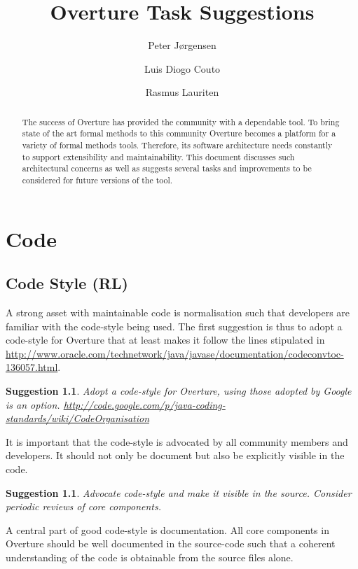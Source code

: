 \documentclass[11pt]{overturerep} \usepackage{t1enc,times,a4,t1enc}
\title{Overture Task Suggestions}
\author{ Peter J\o rgensen \and Luis Diogo Couto \and Rasmus Lauriten }
\newtheorem{sug}[subsection]{Suggestion}
\begin{document}
\maketitle


\begin{abstract} 
    The success of Overture has provided the community with a dependable tool.
    To bring state of the art formal methods to this community Overture becomes
    a platform for a variety of formal methods tools.  Therefore, its software
    architecture needs constantly to support extensibility and maintainability.
    This document discusses such architectural concerns as well as suggests
    several tasks and improvements to be considered for future versions of the
    tool.  
\end{abstract}


\chapter{Code}

\section{Code Style (RL)} 
A strong asset with maintainable code is normalisation such that developers
are familiar with the code-style being used.  The first suggestion is thus
to adopt a code-style for Overture that at least makes it follow the lines
stipulated in
\url{http://www.oracle.com/technetwork/java/javase/documentation/codeconvtoc-136057.html}.

\begin{sug} 
    Adopt a code-style for Overture, using those adopted by Google
    is an option.
    \url{http://code.google.com/p/java-coding-standards/wiki/CodeOrganisation}
\end{sug}

It is important that the code-style is advocated by all community members
and developers. It should not only be document but also be explicitly
visible in the code.

\begin{sug} 
    Advocate code-style and make it visible in the source. Consider
    periodic reviews of core components.  
\end{sug}

A central part of good code-style is documentation. All core components
in Overture should be well documented in the source-code such that a
coherent understanding of the code is obtainable from the source files
alone.
\end{document}
